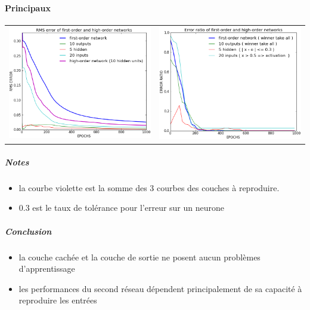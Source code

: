 \documentclass[a4paper,12pt]{article}
\begin{document}
      \paragraph*{Principaux}
	\begin{center}
	  \begin{tabular}{lr}
	    \hspace*{-1cm}
	    \includegraphics[width=250px]{../cleeremans_2007/digit_reco/rms_ffa.png}
	    &
	    \includegraphics[width=250px]{../cleeremans_2007/digit_reco/err_ffa.png} 
	  \end{tabular}
	\end{center}
	\subparagraph*{Notes}
	  \begin{itemize}
	  \item la courbe violette est la somme des 3 courbes des couches à reproduire.
	  \item 0.3 est le taux de tolérance pour l'erreur sur un neurone
	  \end{itemize}
	  
	\subparagraph*{Conclusion}
	  \begin{itemize}
	    \item la couche cachée et la couche de sortie ne posent aucun problèmes d'apprentissage
	    \item les performances du second réseau dépendent principalement de sa capacité à reproduire les entrées
	  \end{itemize}
	  
	  
	
\end{document}
